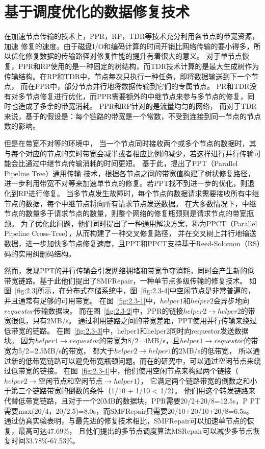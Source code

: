 \section{基于调度优化的数据修复技术}

在加速节点传输的技术上，PPR\cite{mitra2016partial}，RP\cite{li2017repair}，TDR\cite{li2009tree}等技术充分利用各节点的带宽资源，加速
修复的速度。由于磁盘I/O和编码计算的时间开销比网络传输的要小得多\cite{li2017repair,mitra2016partial}，所以优化修复数据的传输路径对修复性能的提升有着很大的意义。
对于单节点恢复，PPR和RP使用的是一种固定的树结构，而TDR技术计算的是最大生成树作为传输结构。在RP和TDR中，节点每次只执行一种任务，即将数据输送到下一个节点，
而在PPR中，部分节点并行地将数据传输到它们的专属节点。
PR和TDR没有对多节点修复进行优化，而PPR需要额外的中继节点来参与多节点的修复，同时也造成了多余的带宽消耗。
PPR和RP针对的是流量均匀的网络，
而对于TDR来说，基于的假设是：每个链路的带宽是一个常数，不受到连接到同一节点的节点数的影响。

但是在带宽不对等的环境中，
当一个节点同时接收两个或多个节点的数据时，其与每个对应的节点的实时带宽会减半或者相应比例的减少，若这样进行并行传输可能会比通过中继节点传输消耗的时间更短。
基于此，\citet{bai2019fast}提出了PPT（Parallel Pipeline Tree）通用传输
技术，根据各节点之间的带宽值构建了树状修复路径，进一步利用带宽不对等来加速单节点的修复。若PPT找不到进一步的优化，则退化到RP进行修复。
当多节点发生故障时，每个节点的数据请求需要接收所有中继节点的数据，每个中继节点将向所有请求节点发送数据。
在大多数情况下，中继节点的数量多于请求节点的数量，则整个网络的修复瓶颈则是请求节点的带宽瓶颈。
为了优化此问题，他们同时提出了一种通用解决方案，称为PPCT（Parallel Pipeline Cross-Tree），从而构建了一种交叉修复路径，
并在交叉树上并行地输送数据，进一步加快多节点修复速度，且PPT和PPCT支持基于Reed-Solomon（RS）码的实用纠删码结构。

然而，\citet{zhou2022bandwidth}发现PPT的并行传输会引发网络拥堵和带宽争夺消耗，同时会产生新的低带宽链路。基于此他们提出了SMFRepair，一种单节点多级传输的修复技术。
如图~\ref{fig:2.3}所示，在分布式存储系统中，图~\ref{fig:2.3-4}中空闲节点是非常普遍的，并且通常有足够的可用带宽。
在图~\ref{fig:2.3-1}中，$helper1$和$helper2$会异步地向$requestor$传输数据块。
而在图~\ref{fig:2.3-2}中，PPR的链接$helper2 \rightarrow helper2$的带宽很低，只有2MB/s。
通过利用链路之间的带宽差距，PPT使用并行传输来绕过低带宽的链路。
在图~\ref{fig:2.3-3}中，helper1和helper2同时向requestor发送数据块。
因为$helper1 \rightarrow requestor$的带宽为8/2=4MB/s，且$helper1 \rightarrow requestor$的带宽为5/2=2.5MB/s的带宽，
都大于$helper2 \rightarrow helper1$的2MB/s的低带宽，
所以通过新的低带宽链路可以避免带宽瓶颈问题。而在\citet{zhou2022bandwidth}的研究中，可以通过空闲节点来绕过低带宽的链接。
在图~\ref{fig:2.3-4}中，他们使用空闲节点来构建两个链接（$helper2 \rightarrow $空闲节点和空闲节点$\rightarrow helper1$），
它满足两个链路带宽的倒数之和小于第三个链路带宽的倒数的条件（1/10 + 1/10 < 1/2）。
他们用这个转发链路来代替低带宽链路，且对于一个20MB的数据块，PPR需要20/2+20/8=12.5s，P
PT需要max(20/4，20/2.5)=8.0s，而SMFRepair只需要20/10+20/10+20/8=6.5s。
通过仿真实验表明，与最先进的修复技术相比，SMFRepair可以加速单节点的恢复，最高可达47.69\%，
且他们提出的多节点调度算法MSRepair可以减少多节点恢复时间33.78\%-67.53\%。

